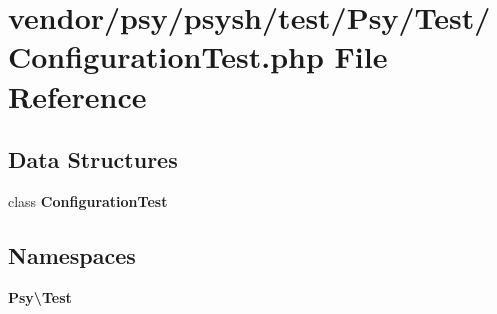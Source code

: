 \section{vendor/psy/psysh/test/\+Psy/\+Test/\+Configuration\+Test.php File Reference}
\label{psy_2psysh_2test_2_psy_2_test_2_configuration_test_8php}
\subsection*{Data Structures}
\begin{DoxyCompactItemize}
\item 
class {\bf Configuration\+Test}
\end{DoxyCompactItemize}
\subsection*{Namespaces}
\begin{DoxyCompactItemize}
\item 
 {\bf Psy\textbackslash{}\+Test}
\end{DoxyCompactItemize}
